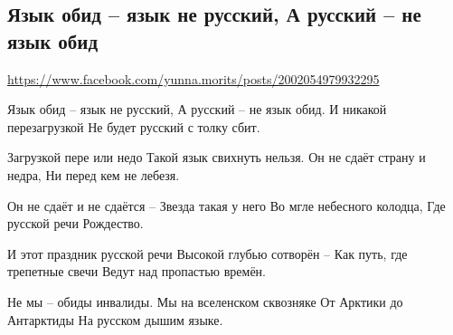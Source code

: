  
 
 
 
 

\subsection{Язык обид – язык не русский, А русский – не язык обид}
\url{https://www.facebook.com/yunna.morits/posts/2002054979932295}

Язык обид – язык не русский,
А русский – не язык обид.
И никакой перезагрузкой
Не будет русский с толку сбит.

Загрузкой пере или недо
Такой язык свихнуть нельзя.
Он не сдаёт страну и недра,
Ни перед кем не лебезя.

Он не сдаёт и не сдаётся –
Звезда такая у него
Во мгле небесного колодца,
Где русской речи Рождество.

И этот праздник русской речи
Высокой глубью сотворён –
Как путь, где трепетные свечи
Ведут над пропастью времён.

Не мы – обиды инвалиды.
Мы на вселенском сквозняке
От Арктики до Антарктиды
На русском дышим языке.
